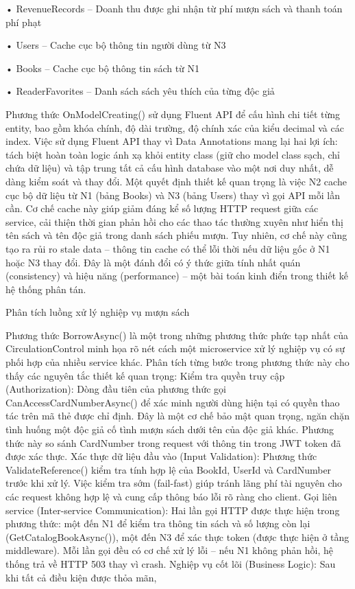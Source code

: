 • RevenueRecords – Doanh thu được ghi nhận từ phí mượn sách và thanh toán phí phạt

• Users – Cache cục bộ thông tin người dùng từ N3

• Books – Cache cục bộ thông tin sách từ N1

• ReaderFavorites – Danh sách sách yêu thích của từng độc giả

Phương thức OnModelCreating() sử dụng Fluent API để cấu hình chi tiết từng entity, bao gồm khóa chính, độ dài trường, độ chính xác của kiểu decimal và các index. Việc sử dụng Fluent API thay vì Data Annotations mang lại hai lợi ích: tách biệt hoàn toàn logic ánh xạ khỏi entity class (giữ cho model class sạch, chỉ chứa dữ liệu) và tập trung tất cả cấu hình database vào một nơi duy nhất, dễ dàng kiểm soát và thay đổi. Một quyết định thiết kế quan trọng là việc N2 cache cục bộ dữ liệu từ N1 (bảng Books) và N3 (bảng Users) thay vì gọi API mỗi lần cần. Cơ chế cache này giúp giảm đáng kể số lượng HTTP request giữa các service, cải thiện thời gian phản hồi cho các thao tác thường xuyên như hiển thị tên sách và tên độc giả trong danh sách phiếu mượn. Tuy nhiên, cơ chế này cũng tạo ra rủi ro stale data – thông tin cache có thể lỗi thời nếu dữ liệu gốc ở N1 hoặc N3 thay đổi. Đây là một đánh đổi có ý thức giữa tính nhất quán (consistency) và hiệu năng (performance) – một bài toán kinh điển trong thiết kế hệ thống phân tán.

Phân tích luồng xử lý nghiệp vụ mượn sách

Phương thức BorrowAsync() là một trong những phương thức phức tạp nhất của CirculationControl minh họa rõ nét cách một microservice xử lý nghiệp vụ có sự phối hợp của nhiều service khác. Phân tích từng bước trong phương thức này cho thấy các nguyên tắc thiết kế quan trọng: Kiểm tra quyền truy cập (Authorization): Dòng đầu tiên của phương thức gọi CanAccessCardNumberAsync() để xác minh người dùng hiện tại có quyền thao tác trên mã thẻ được chỉ định. Đây là một cơ chế bảo mật quan trọng, ngăn chặn tình huống một độc giả cố tình mượn sách dưới tên của độc giả khác. Phương thức này so sánh CardNumber trong request với thông tin trong JWT token đã được xác thực. Xác thực dữ liệu đầu vào (Input Validation): Phương thức ValidateReference() kiểm tra tính hợp lệ của BookId, UserId và CardNumber trước khi xử lý. Việc kiểm tra sớm (fail-fast) giúp tránh lãng phí tài nguyên cho các request không hợp lệ và cung cấp thông báo lỗi rõ ràng cho client. Gọi liên service (Inter-service Communication): Hai lần gọi HTTP được thực hiện trong phương thức: một đến N1 để kiểm tra thông tin sách và số lượng còn lại (GetCatalogBookAsync()), một đến N3 để xác thực token (được thực hiện ở tầng middleware). Mỗi lần gọi đều có cơ chế xử lý lỗi – nếu N1 không phản hồi, hệ thống trả về HTTP 503 thay vì crash. Nghiệp vụ cốt lõi (Business Logic): Sau khi tất cả điều kiện được thỏa mãn,

